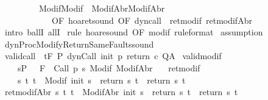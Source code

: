 \begin{isabellebody}
\ \ \ \ \ \ \ \ {\isacharbrackleft}\ Modif{\isacharequal}Modif\ \ ModifAbr{\isacharequal}ModifAbr{\isacharcomma}\isanewline
\ \ \ \ \ \ \ \ \ \ \ \ OF\ hoaret{\isacharunderscore}sound\ {\isacharbrackleft}OF\ dyn{\isacharunderscore}call{\isacharbrackright}\ {\isacharunderscore}\ ret{\isacharunderscore}modif\ ret{\isacharunderscore}modifAbr{\isacharbrackright}{\isacharparenright}\isanewline
{}\isamarkupfalse%
\ {\isacharparenleft}intro\ ballI\ allI{\isacharparenright}\isanewline
{}\isamarkupfalse%
\ {\isacharparenleft}rule\ hoare{\isacharunderscore}sound\ {\isacharbrackleft}OF\ modif\ {\isacharbrackleft}rule{\isacharunderscore}format{\isacharbrackright}{\isacharbrackright}{\isacharparenright}\isanewline
{}\isamarkupfalse%
\ assumption\isanewline
{}\isamarkupfalse%
%
\endisatagproof
{\isafoldproof}%
%
\isadelimproof
\isanewline
%
\endisadelimproof
\isanewline
{}\isamarkupfalse%
\ dynProcModifyReturnSameFaults{\isacharunderscore}sound{\isacharcolon}\isanewline
{}\ valid{\isacharunderscore}call{\isacharcolon}\ {\isachardoublequoteopen}{\isasymGamma}{\isacharcomma}{\isasymTheta}\ {\isasymTurnstile}\isactrlsub t\isactrlbsub {\isacharslash}F\isactrlesub \ P\ dynCall\ init\ p\ return{\isacharprime}\ c\ Q{\isacharcomma}A{\isachardoublequoteclose}\isanewline
{}\ valid{\isacharunderscore}modif{\isacharcolon}\ \isanewline
\ \ \ \ {\isachardoublequoteopen}{\isasymforall}s{\isasymin}P{\isachardot}\ {\isasymforall}{\isasymsigma}{\isachardot}\ {\isasymGamma}{\isacharcomma}{\isasymTheta}\ {\isasymTurnstile}\isactrlbsub {\isacharslash}F\isactrlesub \ {\isacharbraceleft}{\isasymsigma}{\isacharbraceright}\ Call\ {\isacharparenleft}p\ s{\isacharparenright}\ {\isacharparenleft}Modif\ {\isasymsigma}{\isacharparenright}{\isacharcomma}{\isacharparenleft}ModifAbr\ {\isasymsigma}{\isacharparenright}{\isachardoublequoteclose}\ \isanewline
{}\ ret{\isacharunderscore}modif{\isacharcolon}\isanewline
\ \ \ \ {\isachardoublequoteopen}{\isasymforall}s\ t{\isachardot}\ t\ {\isasymin}\ Modif\ {\isacharparenleft}init\ s{\isacharparenright}\ {\isasymlongrightarrow}\ return{\isacharprime}\ s\ t\ {\isacharequal}\ return\ s\ t{\isachardoublequoteclose}\isanewline
{}\ ret{\isacharunderscore}modifAbr{\isacharcolon}\ {\isachardoublequoteopen}{\isasymforall}s\ t{\isachardot}\ t\ {\isasymin}\ ModifAbr\ {\isacharparenleft}init\ s{\isacharparenright}\ {\isasymlongrightarrow}\ return{\isacharprime}\ s\ t\ {\isacharequal}\ return\ s\ t{\isachardoublequoteclose}\isanewline

\end{isabellebody}
